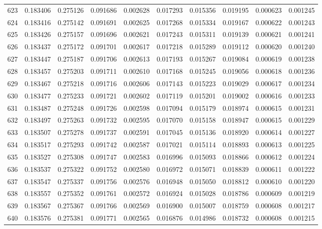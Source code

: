 \begin{tabular}{lrrrrrrrrr}
623 & 0.183406 & 0.275126 & 0.091686 & 0.002628 & 0.017293 & 0.015356 & 0.019195 & 0.000623 & 0.001245 \\
624 & 0.183416 & 0.275142 & 0.091691 & 0.002625 & 0.017268 & 0.015334 & 0.019167 & 0.000622 & 0.001243 \\
625 & 0.183426 & 0.275157 & 0.091696 & 0.002621 & 0.017243 & 0.015311 & 0.019139 & 0.000621 & 0.001241 \\
626 & 0.183437 & 0.275172 & 0.091701 & 0.002617 & 0.017218 & 0.015289 & 0.019112 & 0.000620 & 0.001240 \\
627 & 0.183447 & 0.275187 & 0.091706 & 0.002613 & 0.017193 & 0.015267 & 0.019084 & 0.000619 & 0.001238 \\
628 & 0.183457 & 0.275203 & 0.091711 & 0.002610 & 0.017168 & 0.015245 & 0.019056 & 0.000618 & 0.001236 \\
629 & 0.183467 & 0.275218 & 0.091716 & 0.002606 & 0.017143 & 0.015223 & 0.019029 & 0.000617 & 0.001234 \\
630 & 0.183477 & 0.275233 & 0.091721 & 0.002602 & 0.017119 & 0.015201 & 0.019002 & 0.000616 & 0.001233 \\
631 & 0.183487 & 0.275248 & 0.091726 & 0.002598 & 0.017094 & 0.015179 & 0.018974 & 0.000615 & 0.001231 \\
632 & 0.183497 & 0.275263 & 0.091732 & 0.002595 & 0.017070 & 0.015158 & 0.018947 & 0.000615 & 0.001229 \\
633 & 0.183507 & 0.275278 & 0.091737 & 0.002591 & 0.017045 & 0.015136 & 0.018920 & 0.000614 & 0.001227 \\
634 & 0.183517 & 0.275293 & 0.091742 & 0.002587 & 0.017021 & 0.015114 & 0.018893 & 0.000613 & 0.001225 \\
635 & 0.183527 & 0.275308 & 0.091747 & 0.002583 & 0.016996 & 0.015093 & 0.018866 & 0.000612 & 0.001224 \\
636 & 0.183537 & 0.275322 & 0.091752 & 0.002580 & 0.016972 & 0.015071 & 0.018839 & 0.000611 & 0.001222 \\
637 & 0.183547 & 0.275337 & 0.091756 & 0.002576 & 0.016948 & 0.015050 & 0.018812 & 0.000610 & 0.001220 \\
638 & 0.183557 & 0.275352 & 0.091761 & 0.002572 & 0.016924 & 0.015028 & 0.018786 & 0.000609 & 0.001219 \\
639 & 0.183567 & 0.275367 & 0.091766 & 0.002569 & 0.016900 & 0.015007 & 0.018759 & 0.000608 & 0.001217 \\
640 & 0.183576 & 0.275381 & 0.091771 & 0.002565 & 0.016876 & 0.014986 & 0.018732 & 0.000608 & 0.001215 \\

\end{tabular}
